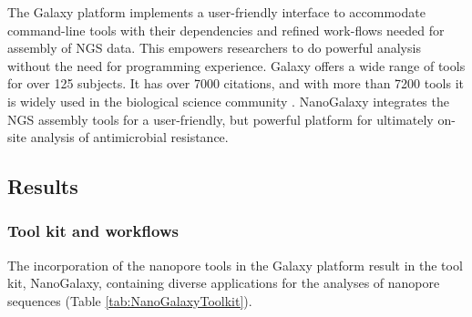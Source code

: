 \documentclass[a4paper,num-refs]{oup-contemporary}
\begin{document}
The Galaxy platform implements a user-friendly interface to accommodate command-line tools with their dependencies and refined work-flows needed for assembly of NGS data. This empowers researchers to do powerful analysis without the need for programming experience. Galaxy offers a wide range of tools for over 125 subjects. It has over 7000 citations, and with more than 7200 tools it is widely used in the biological science community \cite{Galaxycitations, Galaxytoolshed}. NanoGalaxy integrates the NGS assembly tools for a user-friendly, but powerful platform for ultimately on-site analysis of antimicrobial resistance.


\subsection{Results}

\subsubsection{Tool kit and workflows}
The incorporation of the nanopore tools in the Galaxy platform result in the tool kit, NanoGalaxy, containing diverse
applications for the analyses of nanopore sequences (Table \ref{tab:NanoGalaxyToolkit}).
\end{document}

